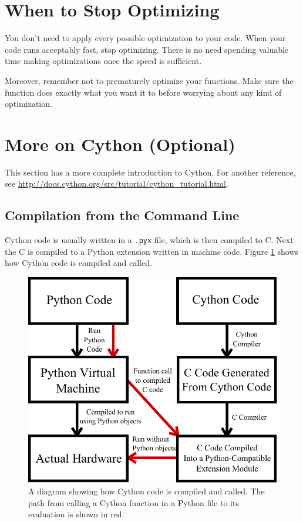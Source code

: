 \section*{When to Stop Optimizing}
You don't need to apply every possible optimization to your code.
When your code runs acceptably fast, stop optimizing. There is no need spending valuable time making optimizations once the speed is sufficient. 

Moreover, remember not to prematurely optimize your functions. Make sure the function does exactly what you want it to before worrying about any kind of optimization.

























      
\section*{More on Cython (Optional)}
This section has a more complete introduction to Cython. 
For another reference, see \url{http://docs.cython.org/src/tutorial/cython_tutorial.html}.

\subsection*{Compilation from the Command Line}

Cython code is usually written in a \texttt{.pyx} file, which is then compiled to C.
Next the C is compiled to a Python extension written in machine code.
Figure \ref{cython:compilation} shows how Cython code is compiled and called.

\begin{figure}
\centering
\includegraphics[width=.7\textwidth]{compilation.pdf}
\caption{A diagram showing how Cython code is compiled and called.
The path from calling a Cython function in a Python file to its evaluation is shown in red.}
\label{cython:compilation}
\end{figure}

